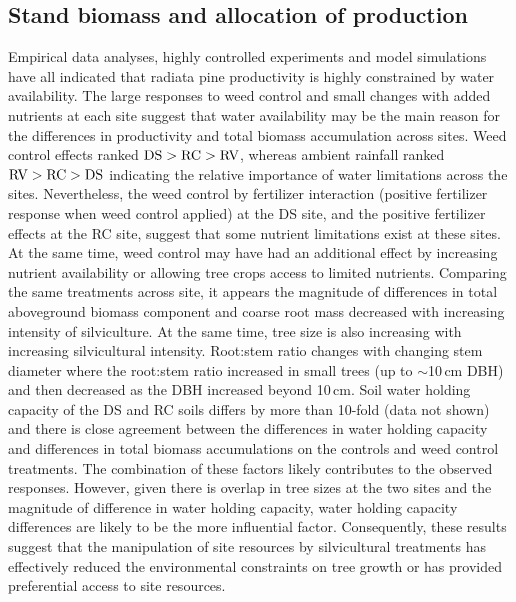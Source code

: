 \documentclass[final]{foresj}
\begin{document}
\subsection{Stand biomass and allocation of production}

Empirical data analyses,\cite{24,59} highly controlled
experiments\cite{8,33,60} and model simulations\cite{21,61}
have all indicated that radiata pine productivity is highly
constrained by water availability. The large responses to
weed control and small changes with added nutrients at each
site suggest that water availability may be the main reason
for the differences in productivity and total biomass
accumulation across sites. Weed control effects ranked
$\hbox{DS}> \hbox{RC} > \hbox{RV}$, whereas ambient
rainfall ranked $\hbox{RV}> \hbox{RC} > \hbox{DS}$
indicating the relative importance of water limitations
across the sites. Nevertheless, the weed control by
fertilizer interaction (positive fertilizer response when
weed control applied) at the DS site, and the positive
fertilizer effects at the RC site, suggest that some
nutrient limitations exist at these sites. At the same
time, weed control may have had an additional effect by
increasing nutrient availability or allowing tree crops
access to limited nutrients. Comparing the same treatments
across site, it appears the magnitude of differences in
total aboveground biomass component and coarse root mass
decreased with increasing intensity of silviculture. At the
same time, tree size is also increasing with increasing
silvicultural intensity. Root:stem ratio changes with
changing stem diameter where the root:stem ratio increased
in small trees (up to $\sim$10\,cm DBH)\cite{62,63} and
then decreased as the DBH increased beyond 10\,cm.\cite{62,64}
Soil water holding capacity of the DS and RC soils differs by
more than 10-fold (data not shown) and there is close agreement
between the differences in water holding \hbox{capacity} and differences in total biomass
accumulations on the controls and weed control treatments.
The combination of these factors likely contributes to the
observed responses. However, given there is overlap in tree
sizes at the two sites and the magnitude of difference in
water holding capacity, water holding capacity differences
are likely to be the more influential factor. Consequently,
these results suggest that the manipulation of site
resources by silvicultural treatments has effectively
reduced the environmental constraints on tree growth or has
provided preferential access to site resources.\cite{32}
\end{document}
